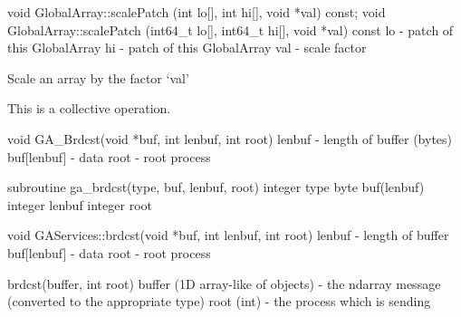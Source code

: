 \documentclass[12pt]{article}
\begin{document}
\begin{cxxapi}
void GlobalArray::scalePatch (int lo[], int hi[], void *val) const;
void GlobalArray::scalePatch (int64_t lo[], int64_t hi[], void *val) const
   lo                                - patch of this GlobalArray           \access{[input]}
   hi                                - patch of this GlobalArray           \access{[input]}
   val                               - scale factor                        \access{[input]}
\end{cxxapi}

\begin{desc}

Scale an array by the factor `val'

This is a collective operation.
\end{desc}


\begin{capi}
void GA_Brdcst(void *buf, int lenbuf, int root)
   lenbuf         - length of buffer (bytes)                               \access{[input]} 
   buf[lenbuf]    - data                                             
   root           - root process                                           \access{[input]} 
\end{capi}

\begin{fapi}
subroutine ga_brdcst(type, buf, lenbuf, root)
   integer type                                                            \access{[input]} 
   byte buf(lenbuf)                                                  
   integer lenbuf                                                          \access{[input]} 
   integer root                                                            \access{[input]} 
\end{fapi}

\begin{cxxapi}
void GAServices::brdcst(void *buf, int lenbuf, int root)
   lenbuf         - length of buffer                                       \access{[input]}
   buf[lenbuf]    - data                                            
   root           - root process                                           \access{[input]}
\end{cxxapi}

\begin{pyapi}
brdcst(buffer, int root) 
   buffer (1D array-like of objects) - the ndarray message
                                       (converted to the appropriate type) 
   root (int)                        - the process which is sending 
\end{pyapi}
\end{document}
